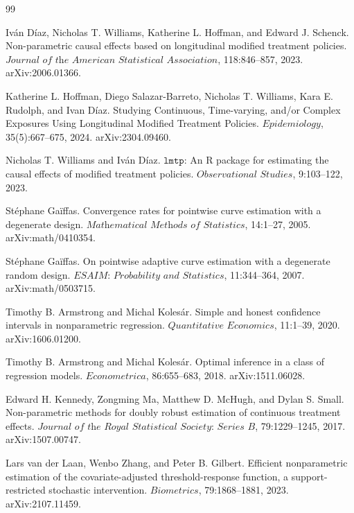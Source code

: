 \documentclass{article}
\begin{document}
\begin{thebibliography}{99}

   Iván Díaz, Nicholas T. Williams, Katherine L. Hoffman, and Edward J. Schenck. Non-parametric causal effects based on longitudinal modified treatment policies. \(\textit{Journal of the American Statistical Association}\), 118:846--857, 2023. arXiv:2006.01366.

   Katherine L. Hoffman, Diego Salazar-Barreto, Nicholas T. Williams, Kara E. Rudolph, and Ivan Díaz. Studying Continuous, Time-varying, and/or Complex Exposures Using Longitudinal Modified Treatment Policies. \(\textit{Epidemiology}\), 35(5):667--675, 2024. arXiv:2304.09460.

   Nicholas T. Williams and Iván Díaz. \(\texttt{lmtp}\): An R package for estimating the causal effects of modified treatment policies. \(\textit{Observational Studies}\), 9:103--122, 2023.

   Stéphane Gaïffas. Convergence rates for pointwise curve estimation with a degenerate design. \(\textit{Mathematical Methods of Statistics}\), 14:1--27, 2005. arXiv:math/0410354.

   Stéphane Gaïffas. On pointwise adaptive curve estimation with a degenerate random design. \(\textit{ESAIM: Probability and Statistics}\), 11:344--364, 2007. arXiv:math/0503715.

   Timothy B. Armstrong and Michal Kolesár. Simple and honest confidence intervals in nonparametric regression. \(\textit{Quantitative Economics}\), 11:1--39, 2020. arXiv:1606.01200.

   Timothy B. Armstrong and Michal Kolesár. Optimal inference in a class of regression models. \(\textit{Econometrica}\), 86:655--683, 2018. arXiv:1511.06028.

   Edward H. Kennedy, Zongming Ma, Matthew D. McHugh, and Dylan S. Small. Non-parametric methods for doubly robust estimation of continuous treatment effects. \(\textit{Journal of the Royal Statistical Society: Series B}\), 79:1229--1245, 2017. arXiv:1507.00747.

   Lars van der Laan, Wenbo Zhang, and Peter B. Gilbert. Efficient nonparametric estimation of the covariate-adjusted threshold-response function, a support-restricted stochastic intervention. \(\textit{Biometrics}\), 79:1868--1881, 2023. arXiv:2107.11459.


\end{thebibliography}
\end{document}
